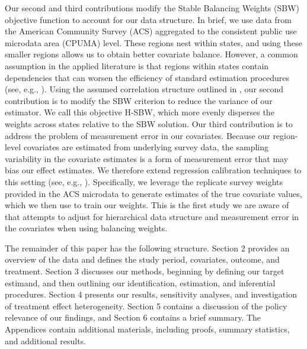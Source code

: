 Our second and third contributions modify the Stable Balancing Weights (SBW) objective function to account for our data structure. In brief, we use data from the American Community Survey (ACS) aggregated to the consistent public use microdata area (CPUMA) level. These regions nest within states, and using these smaller regions allows us to obtain better covariate balance. However, a common assumption in the applied literature is that regions within states contain dependencies that can worsen the efficiency of standard estimation procedures (see, e.g., \cite{cameron2015practitioner}). Using the assumed correlation structure outlined in \cite{kloek1981ols}, our second contribution is to modify the SBW criterion to reduce the variance of our estimator. We call this objective H-SBW, which more evenly disperses the weights across states relative to the SBW solution. Our third contribution is to address the problem of measurement error in our covariates. Because our region-level covariates are estimated from underlying survey data, the sampling variability in the covariate estimates is a form of measurement error that may bias our effect estimates. We therefore extend regression calibration techniques to this setting (see, e.g., \cite{gleser1992importance}). Specifically, we leverage the replicate survey weights provided in the ACS microdata to generate estimates of the true covariate values, which we then use to train our weights. This is the first study we are aware of that attempts to adjust for hierarchical data structure and measurement error in the covariates when using balancing weights.

The remainder of this paper has the following structure. Section 2 provides an overview of the data and defines the study period, covariates, outcome, and treatment. Section 3 discusses our methods, beginning by defining our target estimand, and then outlining our identification, estimation, and inferential procedures. Section 4 presents our results, sensitivity analyses, and investigation of treatment effect heterogeneity. Section 5 contains a discussion of the policy relevance of our findings, and Section 6 contains a brief summary. The Appendices contain additional materials, including proofs, summary statistics, and additional results.
